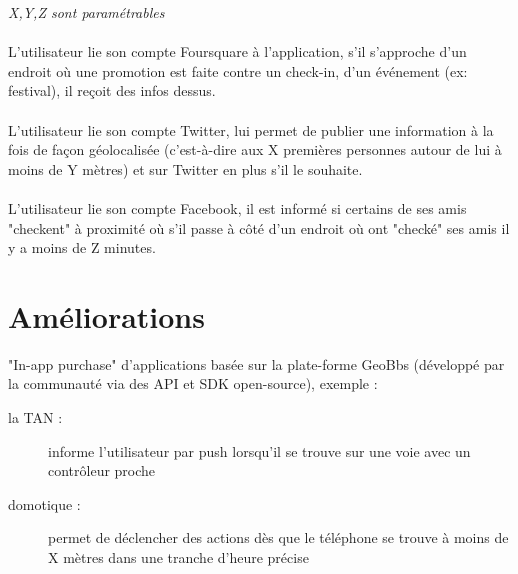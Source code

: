 \documentclass[a4paper,12pt]{report}
\begin{document}
\begin{onehalfspace}
	\emph{X,Y,Z sont paramétrables}

	\paragraph{}
	L’utilisateur lie son compte Foursquare à l’application, s’il s’approche d’un endroit où une promotion est faite contre un check-in, d’un événement (ex: festival), il reçoit des infos dessus.

	\paragraph{}
	L’utilisateur lie son compte Twitter, lui permet de publier une information à la fois de façon géolocalisée (c'est-à-dire aux X premières personnes autour de lui à moins de Y mètres) et sur Twitter en plus s’il le souhaite.

	\paragraph{}
	L’utilisateur lie son compte Facebook, il est informé si certains de ses amis "checkent" à proximité où s’il passe à côté d’un endroit où ont "checké" ses amis il y a moins de Z minutes.

	\section*{Améliorations}

	"In-app purchase" d’applications basée sur la plate-forme GeoBbs (développé par la communauté via des API et SDK open-source), exemple :
		\begin{description}
		\item[la TAN :] informe l’utilisateur par push lorsqu’il se trouve sur une voie avec un contrôleur proche
		\item[domotique :] permet de déclencher des actions dès que le téléphone se trouve à moins de X mètres dans une tranche d’heure précise
		\end{description}

	\end{onehalfspace}
\end{document}
